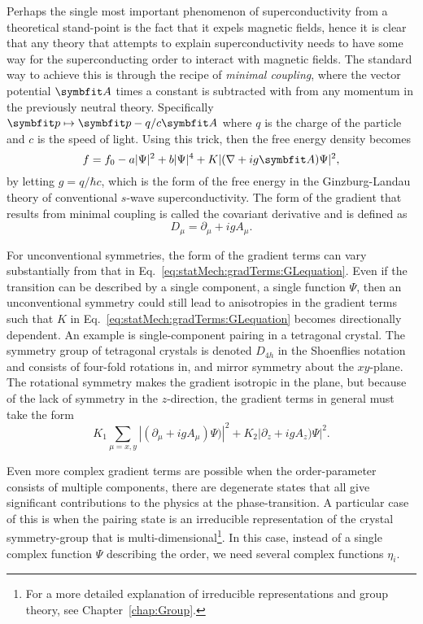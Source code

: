 Perhaps the single most important phenomenon of superconductivity from a theoretical stand-point is the fact that it expels
magnetic fields, hence it is clear that any theory that attempts to explain superconductivity needs to have some way for the
superconducting order to interact with magnetic fields. The standard way to achieve this is through the recipe of
\emph{minimal coupling}, where the vector potential $\v{A}$ times a constant is subtracted with from any momentum
in the previously neutral theory. Specifically $\v{p}\mapsto \v{p}-q/c\v{A}$ where $q$ is the charge of the particle and
$c$ is the speed of light. Using this trick, then the free energy density becomes
\begin{equation}
    \label{eq:statMech:gradTerms:GLequation}
    f = f_0 - a\abs{\Psi}^2 + b\abs{\Psi}^4 + K\abs{(\nabla+ig\v{A})\Psi}^2,
\end{equation}
by letting $g=q/\hbar c$, which is the form of the free energy in the Ginzburg-Landau theory of conventional $s$-wave superconductivity.
The form of the gradient that results from minimal coupling is called the covariant derivative and is defined as 
\begin{equation}
    \label{eq:statMech:gradTerms:covariantGradient}
    D_\mu = \partial_\mu + igA_\mu.
\end{equation}

For unconventional symmetries, the form of the gradient terms can vary substantially from that in
Eq.~\eqref{eq:statMech:gradTerms:GLequation}. Even if the transition can be described by a single component, \ie a
single function $\Psi$, then an unconventional symmetry could still lead to anisotropies in the gradient terms such that
$K$ in Eq.~\eqref{eq:statMech:gradTerms:GLequation} becomes directionally dependent.
An example is single-component pairing in a tetragonal crystal. The symmetry group of tetragonal crystals is denoted $D_{4h}$ in the Shoenflies
notation and consists of four-fold rotations in, and mirror symmetry about the $xy$-plane. The rotational symmetry
makes the gradient isotropic in the plane, but because of the lack of symmetry in the $z$-direction, the gradient
terms in general must take the form
\begin{equation}
    \label{eq:statMech:gradTerms:tetragonal}
    K_1\sum_{\mu=x,y}|(\partial_\mu+igA_\mu)\Psi)|^2 + K_2|\partial_z+igA_z)\Psi|^2.
\end{equation}

Even more complex gradient terms are possible when the order-parameter consists of multiple components, \ie there are degenerate
states that all give significant contributions to the physics at the phase-transition. A particular case of this is when the
pairing state is an irreducible representation of the crystal symmetry-group that is multi-dimensional\footnote{For a more detailed explanation
of irreducible representations and group theory, see Chapter~\ref{chap:Group}.}. In this case, instead of a single complex function $\Psi$
describing the order, we need several complex functions $\eta_i$. 

